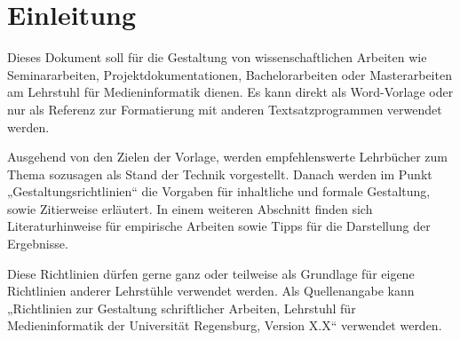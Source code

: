 \section{Einleitung}\label{sec:Einleitung}

Dieses Dokument soll für die Gestaltung von wissenschaftlichen Arbeiten wie Seminararbeiten, Projektdokumentationen, Bachelorarbeiten oder Masterarbeiten am Lehrstuhl für Medieninformatik dienen. Es kann direkt als Word-Vorlage oder nur als Referenz zur Formatierung mit anderen Textsatzprogrammen verwendet werden. 

Ausgehend von den Zielen der Vorlage, werden empfehlenswerte Lehrbücher zum Thema sozusagen als Stand der Technik vorgestellt. Danach werden im Punkt „Gestaltungsrichtlinien“ die Vorgaben für inhaltliche und formale Gestaltung, sowie Zitierweise erläutert. In einem weiteren Abschnitt finden sich Literaturhinweise für empirische Arbeiten sowie Tipps für die Darstellung der Ergebnisse.

Diese Richtlinien dürfen gerne ganz oder teilweise als Grundlage für eigene Richtlinien anderer Lehrstühle verwendet werden. Als Quellenangabe kann „Richtlinien zur Gestaltung schriftlicher Arbeiten, Lehrstuhl für Medieninformatik der Universität Regensburg, Version X.X“ verwendet werden.
